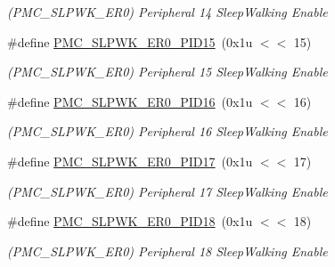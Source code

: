 \begin{DoxyCompactItemize}
\begin{DoxyCompactList}\small\item\em (P\+M\+C\+\_\+\+S\+L\+P\+W\+K\+\_\+\+E\+R0) Peripheral 14 Sleep\+Walking Enable \end{DoxyCompactList}\item 
\mbox{\label{group__SAMS70__PMC_ga87b3b759b1c541a1812078d3fabbd40e}} 
\#define \mbox{\hyperlink{group__SAMS70__PMC_ga87b3b759b1c541a1812078d3fabbd40e}{P\+M\+C\+\_\+\+S\+L\+P\+W\+K\+\_\+\+E\+R0\+\_\+\+P\+I\+D15}}~(0x1u $<$$<$ 15)
\begin{DoxyCompactList}\small\item\em (P\+M\+C\+\_\+\+S\+L\+P\+W\+K\+\_\+\+E\+R0) Peripheral 15 Sleep\+Walking Enable \end{DoxyCompactList}\item 
\mbox{\label{group__SAMS70__PMC_ga13c2d732fdc323eb6082969ce7dd1787}} 
\#define \mbox{\hyperlink{group__SAMS70__PMC_ga13c2d732fdc323eb6082969ce7dd1787}{P\+M\+C\+\_\+\+S\+L\+P\+W\+K\+\_\+\+E\+R0\+\_\+\+P\+I\+D16}}~(0x1u $<$$<$ 16)
\begin{DoxyCompactList}\small\item\em (P\+M\+C\+\_\+\+S\+L\+P\+W\+K\+\_\+\+E\+R0) Peripheral 16 Sleep\+Walking Enable \end{DoxyCompactList}\item 
\mbox{\label{group__SAMS70__PMC_ga0edf786eabc0ca3cf5b8b583f7a59ff8}} 
\#define \mbox{\hyperlink{group__SAMS70__PMC_ga0edf786eabc0ca3cf5b8b583f7a59ff8}{P\+M\+C\+\_\+\+S\+L\+P\+W\+K\+\_\+\+E\+R0\+\_\+\+P\+I\+D17}}~(0x1u $<$$<$ 17)
\begin{DoxyCompactList}\small\item\em (P\+M\+C\+\_\+\+S\+L\+P\+W\+K\+\_\+\+E\+R0) Peripheral 17 Sleep\+Walking Enable \end{DoxyCompactList}\item 
\mbox{\label{group__SAMS70__PMC_ga00c98e4030fb34cad748b3008bd1d66e}} 
\#define \mbox{\hyperlink{group__SAMS70__PMC_ga00c98e4030fb34cad748b3008bd1d66e}{P\+M\+C\+\_\+\+S\+L\+P\+W\+K\+\_\+\+E\+R0\+\_\+\+P\+I\+D18}}~(0x1u $<$$<$ 18)
\begin{DoxyCompactList}\small\item\em (P\+M\+C\+\_\+\+S\+L\+P\+W\+K\+\_\+\+E\+R0) Peripheral 18 Sleep\+Walking Enable \end{DoxyCompactList}\item 

\end{DoxyCompactItemize}
